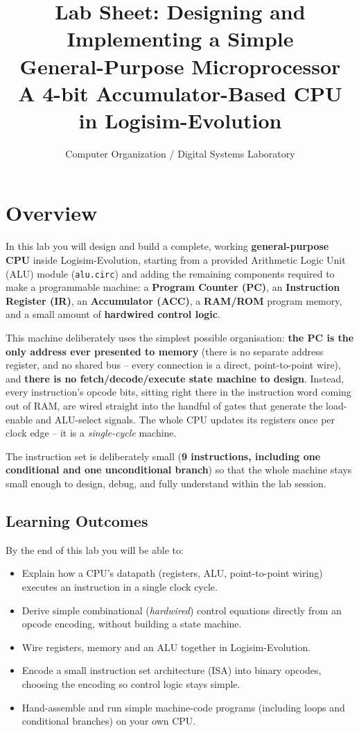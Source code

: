 \documentclass[11pt,a4paper]{article}
\title{\textbf{Lab Sheet: Designing and Implementing a Simple\\ General-Purpose Microprocessor}\\[4pt]
\large A 4-bit Accumulator-Based CPU in Logisim-Evolution}
\author{Computer Organization / Digital Systems Laboratory}
\date{}
\begin{document}
\maketitle
\thispagestyle{fancy}

\section{Overview}

In this lab you will design and build a complete, working \textbf{general-purpose CPU}
inside Logisim-Evolution, starting from a provided Arithmetic Logic Unit (ALU) module
(\texttt{alu.circ}) and adding the remaining components required to make a
programmable machine: a \textbf{Program Counter (PC)}, an \textbf{Instruction
Register (IR)}, an \textbf{Accumulator (ACC)}, a \textbf{RAM/ROM} program
memory, and a small amount of \textbf{hardwired control logic}.

This machine deliberately uses the simplest possible organisation: \textbf{the
PC is the only address ever presented to memory} (there is no separate
address register, and no shared bus -- every connection is a direct,
point-to-point wire), and \textbf{there is no fetch/decode/execute state
machine to design}. Instead, every instruction's opcode bits, sitting right
there in the instruction word coming out of RAM, are wired straight into the
handful of gates that generate the load-enable and ALU-select signals. The
whole CPU updates its registers once per clock edge -- it is a
\emph{single-cycle} machine.

The instruction set is deliberately small (\textbf{9 instructions, including
one conditional and one unconditional branch}) so that the whole machine
stays small enough to design, debug, and fully understand within the lab
session.

\subsection*{Learning Outcomes}
By the end of this lab you will be able to:
\begin{itemize}[nosep]
  \item Explain how a CPU's datapath (registers, ALU, point-to-point wiring)
        executes an instruction in a single clock cycle.
  \item Derive simple combinational (\emph{hardwired}) control equations
        directly from an opcode encoding, without building a state machine.
  \item Wire registers, memory and an ALU together in Logisim-Evolution.
  \item Encode a small instruction set architecture (ISA) into binary opcodes,
        choosing the encoding so control logic stays simple.
  \item Hand-assemble and run simple machine-code programs (including loops
        and conditional branches) on your own CPU.
\end{itemize}
\end{document}
